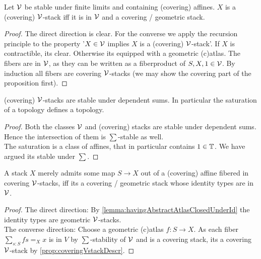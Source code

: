 \begin{prop}{\label{prop:coveringVstackDescr}}
	Let $\mathcal{V}$ be stable under finite limits and containing (covering) affines. $X$ is a (covering) $\mathcal{V}$-stack iff it is in $\mathcal{V}$ and a covering / geometric stack.
\end{prop}
\begin{proof} 	
	The direct direction is clear. For the converse we apply the recursion principle to the property '$X \in \mathcal{V}$ implies $X$ is a (covering) $\mathcal{V}$-stack'. If $X$ is contractible, its clear. Otherwise its equipped with a geometric (c)atlas. The fibers are in $\mathcal{V}$, as they can be written as a fiberproduct of $S, X, 1 \in \mathcal{V}$.  By induction all fibers are covering $\mathcal{V}$-stacks (we may show the covering part of the proposition first). %
\end{proof}
\begin{prop}{\label{prop:CSVSum}}
	(covering) $\mathcal{V}$-stacks are stable under dependent sums. In particular the saturation of a topology defines a topology.
\end{prop}
\begin{proof}
	Both the classes $\mathcal{V}$ and (covering) stacks are stable under dependent sums. Hence the intersection of them is $\sum$-stable as well. \\
	The saturation is a class of affines, that in particular contains $1 \in \mathbb{T}$. We have argued its stable under $\sum$.
\end{proof}
\begin{prop}{\label{prop:V'stacks}}
	A stack $X$ merely admits some map $S \to X$ out of a (covering) affine fibered in covering $\mathcal{V}$-stacks, iff its a covering / geometric stack whose identity types are in $\mathcal{V}$. 
\end{prop}
\begin{proof}
	The direct direction: By \ref{lemma:havingAbstractAtlasClosedUnderId} the identity types are geometric $\mathcal{V}$-stacks. \\
	The converse direction: Choose a geometric (c)atlas $f : S \to X$. As each fiber $\sum_{s : S} f s =_X x$ is in $V$ by $\sum$-stability of $\mathcal{V}$ and is a covering stack, its a covering $\mathcal{V}$-stack by \ref{prop:coveringVstackDescr}.
\end{proof}
